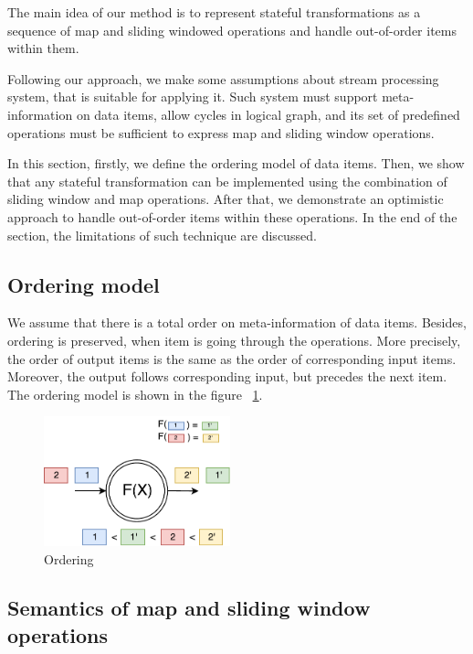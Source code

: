 
\label {fs-optimistic}

The main idea of our method is to represent stateful transformations as a sequence of map and sliding windowed operations and handle out-of-order items within them. 

Following our approach, we make some assumptions about stream processing system, that is suitable for applying it. Such system must support meta-information on data items, allow cycles in logical graph, and its set of predefined operations must be sufficient to express map and sliding window operations.

In this section, firstly, we define the ordering model of data items. Then, we show that any stateful transformation can be implemented using the combination of sliding window and map operations. After that, we demonstrate an optimistic approach to handle out-of-order items within these operations. In the end of the section, the limitations of such technique are discussed.

\subsection{Ordering model}
We assume that there is a total order on meta-information of data items. Besides, ordering is preserved, when item is going through the operations. More precisely, the order of output items is the same as the order of corresponding input items. Moreover, the output follows corresponding input, but precedes the next item. The ordering model is shown in the figure ~\ref{ordering}.

\begin{figure}[htbp]
  \centering
  \includegraphics[width=0.48\textwidth]{pics/ordering}
  \caption{Ordering}
  \label {ordering}
\end{figure}

\subsection{Semantics of map and sliding window operations}


